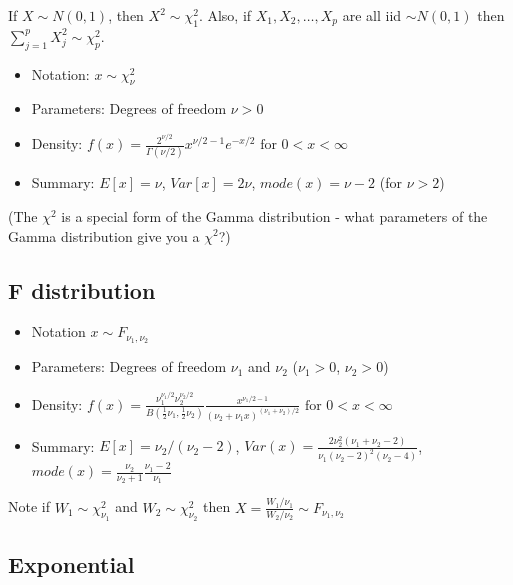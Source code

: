 \documentclass{article}
\begin{document}
If $X \sim N(0,1)$, then $X^2 \sim \chi^2_1$.   Also, if $X_1, X_2, \ldots, X_p$ are all iid $\sim N(0,1)$ then $\sum_{j=1}^p X_j^2 \sim \chi^2_p$.

\begin{itemize}
\item[] Notation: $x \sim \chi^2_\nu$

\item[] Parameters: Degrees of freedom $\nu>0$

\item[] Density: $f(x) = \frac{2^{\nu/2}}{\Gamma(\nu/2)} x^{\nu/2-1}e^{-x/2} \mbox{ for } 0 < x < \infty$

\item[] Summary: $E[x]=\nu$, $Var[x]=2\nu$, $mode(x)=\nu-2$ (for $\nu>2$)
\end{itemize}

(The $\chi^2$ is a special form of the Gamma distribution - what parameters of the Gamma distribution give you a $\chi^2$?)

\subsection{F distribution}

\begin{itemize}

\item[] Notation $x \sim F_{\nu_1,\nu_2}$

\item[] Parameters: Degrees of freedom $\nu_1$ and $\nu_2$ ($\nu_1>0$, $\nu_2>0$)

\item[] Density: $f(x)=\frac{\nu_1^{\nu_1/2}\nu_2^{\nu_2/2}}{B(\frac{1}{2}\nu_1,\frac{1}{2}\nu_2)} \frac{x^{\nu_1/2-1}}{(\nu_2+\nu_1 x)^{(\nu_1+\nu_2)/2}}  \mbox{ for } 0 < x < \infty$

\item[] Summary: $E[x]=\nu_2/(\nu_2-2)$, $Var(x)=\frac{2 \nu_2^2(\nu_1+\nu_2-2)}{\nu_1(\nu_2-2)^2(\nu_2-4)}$, $mode(x)=\frac{\nu_2}{\nu_2+1} \frac{\nu_1-2}{\nu_1}$

\end{itemize}

Note if $W_1 \sim \chi^2_{\nu_1}$ and  $W_2 \sim \chi^2_{\nu_2}$ then $X=\frac{W_1/\nu_1}{W_2/\nu_2} \sim F_{\nu_1, \nu_2}$




\subsection{Exponential}
\end{document}

